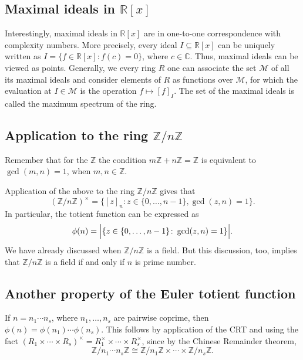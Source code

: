 \documentclass[11pt,a4paper]{amsart}
\newcommand{\Z}{{\mathbb{Z}}}
\newcommand{\R}{{\mathbb{R}}}
\newcommand{\C}{\mathbb{C}}
\begin{document}
 \subsection{Maximal ideals in $\R[x]$} Interestingly, maximal ideals in $\R[x]$ are in one-to-one correspondence with complexity numbers.  More precisely, every ideal $I\subseteq \R[x]$ can be uniquely written as $I = \{ f \in \R[x] \colon f(c) = 0\}$, where $c \in \C$. Thus, maximal ideals can be viewed as points. Generally, we every ring $R$ one can associate the set $\mathcal{M}$ of all its maximal ideals and consider elements of $R$ as functions over $\mathcal{M}$, for which the evaluation at $I \in \mathcal{M}$ is the operation $f \mapsto [f]_I$. The set of the maximal ideals is called the maximum spectrum of the ring. 


\subsection{Application to the ring $\Z / n \Z$} Remember that for the $\Z$ the condition $m \Z + n \Z = \Z$ is equivalent to $\gcd(m,n)=1$, when $m,n \in \Z$. 

Application of the above to the ring $\Z / n \Z$ gives that 
\[
	(\Z / n \Z)^\times = \{ [z]_n : z \in \{0,\ldots,n-1\}, \gcd(z,n)=1\}.
\]
 In particular, the totient function can be expressed as 
 \[
 	\phi(n) = \Bigl| \{ z \in \{0,\ldots,n-1\} \colon \gcd(z,n)=1\} \Bigr|.
 \]
 We have already discussed when $\Z / n \Z$ is a field. But this discussion, too, 
implies that $ \Z / n \Z$ is a field if and only if $n$ is prime number. 


\subsection{Another property of the Euler totient function} If $n= n_1 \cdots n_s$, where $n_1,\ldots,n_s$ are pairwise coprime, then $\phi(n) = \phi(n_1) \cdots \phi(n_s)$. This follows by application of the CRT and using the fact $(R_1 \times \cdots \times R_s)^\times = R_1^\times \times \cdots \times R_s^\times$, since by the Chinese Remainder theorem, 
\[
	\Z / n_1 \cdots n_s \Z \cong \Z / n_1 \Z \times \cdots \times \Z / n_s \Z. 
\]
\end{document}

